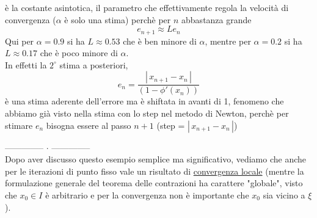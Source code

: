 \documentclass[12pt]{article}
\begin{document}
è la costante asintotica, il parametro che effettivamente regola la velocità di convergenza ($\alpha$ è solo una stima) perchè per $n$ abbastanza grande
\[e_{n+1} \approx Le_n\]
Qui per $\alpha=0.9$ si ha $L \approx 0.53$ che è ben minore di $\alpha$, mentre per $\alpha=0.2$ si ha $L \approx 0.17$ che è poco minore di $\alpha$.\\
In effetti la $2^\circ$ stima a posteriori,
\[e_n = \frac{|\,x_{n+1} - x_n\,|}{(1 - \phi'(x_n))}\]
è una stima aderente dell'errore ma è shiftata in avanti di 1, fenomeno che abbiamo già visto nella stima con lo step nel metodo di Newton, perchè per stimare $e_n$ bisogna essere al passo $n+1$ (step = $|\,x_{n+1}-x_n\,|$)

\medskip
-------------- $\cdot$ --------------\\
Dopo aver discusso questo esempio semplice ma significativo, vediamo che anche per le iterazioni di punto fisso vale un risultato di \underline{convergenza locale} (mentre la formulazione generale del teorema delle contrazioni ha
carattere "globale", visto che $x_0 \in I$ è arbitrario e per la convergenza non è importante che $x_0$ sia vicino a $\xi$).
\end{document}
